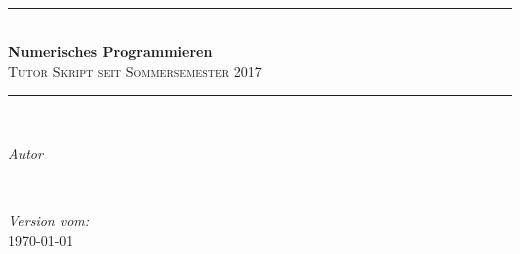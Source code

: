 
\begin{titlepage} %
	\newcommand{\HRule}{\rule{\linewidth}{0.5mm}} %
	
	\center %
	
	
	
	\hspace{1cm} \\[3.5cm]
	
	
	\HRule\\[0.4cm]
	
	{\huge\bfseries Numerisches Programmieren}\\[0.4cm] %
	
	\textsc{\Large Tutor Skript seit Sommersemester 2017}\\[0.5cm] %
	
	\HRule\\[1.5cm]
	
	
	\begin{minipage}{0.4\textwidth}
		\begin{flushleft}
			\large
			\textit{Autor}\\
			\textsc{\npauthor{}} %
		\end{flushleft}
	\end{minipage}
	~
	\begin{minipage}{0.4\textwidth}
		\begin{flushright}
			\large
			\textit{Version vom:}\\
			\textsc{\today} %
		\end{flushright}
	\end{minipage}
	
	

\end{titlepage}

